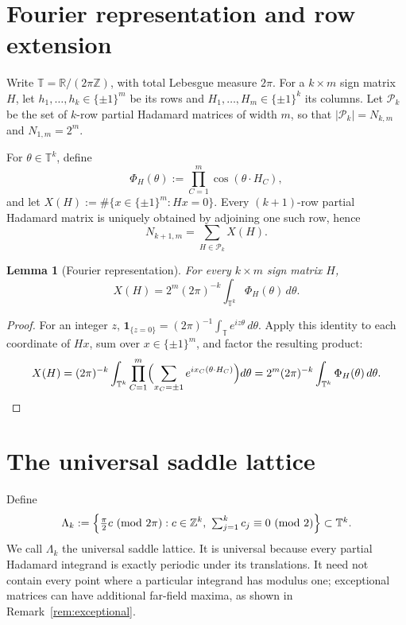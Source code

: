 \documentclass[11pt,reqno]{amsart}
\theoremstyle{plain}
\newtheorem{lemma}[theorem]{Lemma}
\theoremstyle{definition}
\theoremstyle{remark}
\newcommand{\T}{\mathbb T}
\newcommand{\Z}{\mathbb Z}
\newcommand{\R}{\mathbb R}
\begin{document}
\section{Fourier representation and row extension}

Write \(\T=\R/(2\pi\Z)\), with total Lebesgue measure \(2\pi\). For a
\(k\times m\) sign matrix \(H\), let \(h_1,\dots,h_k\in\{\pm1\}^m\) be its rows
and \(H_1,\dots,H_m\in\{\pm1\}^k\) its columns. Let \(\mathcal P_k\) be the set
of \(k\)-row partial Hadamard matrices of width \(m\), so that
\(|\mathcal P_k|=N_{k,m}\) and \(N_{1,m}=2^m\).

For \(\theta\in\T^k\), define
\[
  \Phi_H(\theta):=\prod_{C=1}^m\cos(\theta\cdot H_C),
\]
and let \(X(H):=\#\{x\in\{\pm1\}^m:Hx=0\}\). Every \((k+1)\)-row partial
Hadamard matrix is uniquely obtained by adjoining one such row, hence
\begin{equation}\label{eq:recursion}
  N_{k+1,m}=\sum_{H\in\mathcal P_k}X(H).
\end{equation}

\begin{lemma}[Fourier representation]\label{lem:fourier}
For every \(k\times m\) sign matrix \(H\),
\[
  X(H)=2^m(2\pi)^{-k}\int_{\T^k}\Phi_H(\theta)\,d\theta.
\]
\end{lemma}

\begin{proof}
For an integer \(z\), \(\mathbf 1_{\{z=0\}}=(2\pi)^{-1}\int_\T e^{iz\theta}\,
d\theta\). Apply this identity to each coordinate of \(Hx\), sum over
\(x\in\{\pm1\}^m\), and factor the resulting product:
\[
  X(H)=(2\pi)^{-k}\int_{\T^k}\prod_{C=1}^m
    \Bigl(\sum_{x_C=\pm1}e^{ix_C(\theta\cdot H_C)}\Bigr)d\theta
  =2^m(2\pi)^{-k}\int_{\T^k}\Phi_H(\theta)\,d\theta. \qedhere
\]
\end{proof}

\section{The universal saddle lattice}

Define
\[
  \Lambda_k:=\Bigl\{\tfrac\pi2c\ (\mathrm{mod}\ 2\pi):c\in\Z^k,\
    \textstyle\sum_{j=1}^kc_j\equiv0\ (\mathrm{mod}\ 2)\Bigr\}\subset\T^k.
\]
We call \(\Lambda_k\) the universal saddle lattice. It is universal because
every partial Hadamard integrand is exactly periodic under its translations. It
need not contain every point where a particular integrand has modulus one;
exceptional matrices can have additional far-field maxima, as shown in
Remark~\ref{rem:exceptional}.
\end{document}
